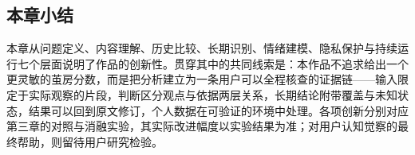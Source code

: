 \subsection{本章小结}\label{section:4.8}

本章从问题定义、内容理解、历史比较、长期识别、情绪建模、隐私保护与持续运行七个层面说明了作品的创新性。贯穿其中的共同线索是：本作品不追求给出一个更灵敏的茧房分数，而是把分析建立为一条用户可以全程核查的证据链——输入限定于实际观察的片段，判断区分观点与依据两层关系，长期结论附带覆盖与未知状态，结果可以回到原文修订，个人数据在可验证的环境中处理。各项创新分别对应第三章的对照与消融实验，其实际改进幅度以实验结果为准；对用户认知觉察的最终帮助，则留待用户研究检验。

